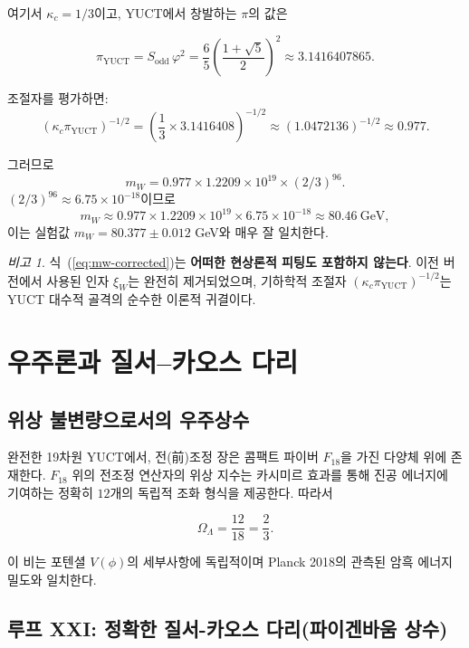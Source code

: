 \documentclass[12pt,a4paper]{article}
\theoremstyle{remark}
\newtheorem{remark}[theorem]{비고}
\begin{document}
	여기서 \(\kappa_c = 1/3\)이고, YUCT에서 창발하는 \(\pi\)의 값은
	
	\[
	\pi_{\mathrm{YUCT}} = S_{\mathrm{odd}} \, \varphi^2
	= \frac{6}{5} \left( \frac{1+\sqrt{5}}{2} \right)^2
	\approx 3.1416407865.
	\]
	
	조절자를 평가하면:
	\[
	\left( \kappa_c \pi_{\mathrm{YUCT}} \right)^{-1/2}
	= \left( \frac{1}{3} \times 3.1416408 \right)^{-1/2}
	\approx (1.0472136)^{-1/2} \approx 0.977.
	\]
	
	그러므로
	\[
	m_W = 0.977 \times 1.2209 \times 10^{19} \times (2/3)^{96}.
	\]
	\((2/3)^{96} \approx 6.75 \times 10^{-18}\)이므로
	\[
	m_W \approx 0.977 \times 1.2209 \times 10^{19} \times 6.75 \times 10^{-18}
	\approx 80.46\ \text{GeV},
	\]
	이는 실험값 \(m_W = 80.377 \pm 0.012\) GeV와 매우 잘 일치한다.
	
	\begin{remark}
		식~(\ref{eq:mw-corrected})는 \textbf{어떠한 현상론적 피팅도 포함하지 않는다}. 이전 버전에서 사용된 인자 \(\xi_W\)는 완전히 제거되었으며, 기하학적 조절자 \((\kappa_c\pi_{\mathrm{YUCT}})^{-1/2}\)는 YUCT 대수적 골격의 순수한 이론적 귀결이다.
	\end{remark}
	
	\section{우주론과 질서--카오스 다리}
	\label{sec:cosmology}
	
	\subsection{위상 불변량으로서의 우주상수}
	
	완전한 19차원 YUCT에서, 전(前)조정 장은 콤팩트 파이버 \(F_{18}\)을 가진 다양체 위에 존재한다. \(F_{18}\) 위의 전조정 연산자의 위상 지수는 카시미르 효과를 통해 진공 에너지에 기여하는 정확히 \(12\)개의 독립적 조화 형식을 제공한다. 따라서
	
	\begin{equation}
		\boxed{\Omega_\Lambda = \frac{12}{18} = \frac{2}{3}}.
		\label{eq:OmegaLambda}
	\end{equation}
	
	이 비는 포텐셜 \(V(\phi)\)의 세부사항에 독립적이며 Planck 2018의 관측된 암흑 에너지 밀도와 일치한다.
	
	\subsection{루프 XXI: 정확한 질서-카오스 다리(파이겐바움 상수)}
	
\end{document}
